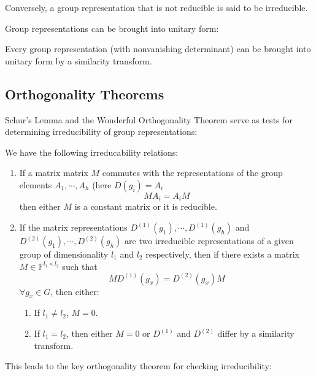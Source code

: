 \documentclass[9pt]{article}
\begin{document}
\begin{multicols}{2}
Conversely, a group representation that is not reducible is said to be irreducible. 

Group representations can be brought into unitary form:
\begin{theorem}
    Every group representation (with nonvanishing determinant) can be brought 
    into unitary form by a similarity transform.
\end{theorem}

\subsection{Orthogonality Theorems}

Schur's Lemma and the Wonderful Orthogonality Theorem serve as tests for determining irreducibility of group representations:

\begin{lemma}
We have the following irreducability relations:
\begin{enumerate}[label=\arabic*.]
    \item If a matrix matrix $M$ commutes with the representations
        of the group elements $A_1,\cdots,A_h$ (here $D(g_i)=A_i$
        $$MA_i=A_iM$$
        then either $M$ is a constant matrix or it is reducible.
    \item If the matrix representations $D^{(1)}(g_1),\cdots,D^{(1)}(g_h)$ and $D^{(2)}(g_1),\cdots,D^{(2)}(g_h)$ are two irreducible representations of a given group
    of dimensionality $l_1$ and $l_2$ respectively, then if there exists a matrix $M \in \mathbb{F}^{l_1 \times l_2}$ such that
    $$MD^{(1)}(g_x)=D^{(2)}(g_x)M$$ $\forall g_x \in G$, then either:
    \begin{enumerate}[label=(\roman*)]
        \item If $l_1 \ne l_2$, $M = 0$.
        \item If $l_1=l_2$, then either $M=0$ or $D^{(1)}$ 
        and $D^{(2)}$ differ by a similarity transform.
    \end{enumerate}
\end{enumerate}
\end{lemma}

This leads to the key orthogonality theorem for checking irreducibility:


\end{multicols}
\end{document}
